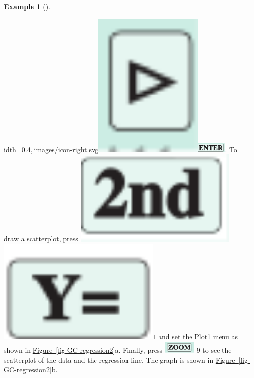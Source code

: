 \documentclass[10pt,]{book}
\theoremstyle{plain}
\theoremstyle{definition}
\theoremstyle{definition}
\newtheorem{example}[theorem]{Example}
\numberwithin{equation}{section}
\begin{document}
\begin{example}[]
\begin{enumerate}[label=*\alph**]
idth=0.4\textwidth,]{images/icon-right.svg}\includegraphics[width=0.4\textwidth,]{images/icon-right.svg}\includegraphics[width=0.11\textwidth,]{images/icon-enter.svg}. To draw a scatterplot, press \includegraphics[width=0.6\textwidth,]{images/icon-2nd.svg}\includegraphics[width=0.6\textwidth,]{images/y-equals.svg}\(1\) and set the Plot1 menu as shown in \hyperref[fig-GC-regression2]{Figure~\ref{fig-GC-regression2}}a. Finally, press \includegraphics[width=0.12\textwidth,]{images/icon-zoom.svg} 9 to see the scatterplot of the data and the regression line. The graph is shown in \hyperref[fig-GC-regression2]{Figure~\ref{fig-GC-regression2}}b.

\end{enumerate}
\end{example}
\end{document}
